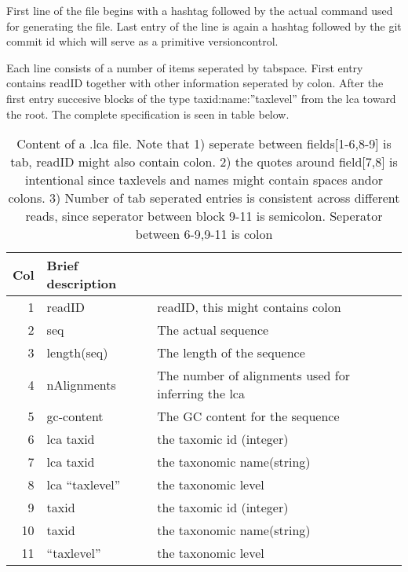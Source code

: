 \documentclass[10pt]{article}
\begin{document}
First line of the file begins with a hashtag followed by the actual command used for generating the file. Last entry of the line is again a hashtag followed by the git commit id which will serve as a primitive versioncontrol.

Each line consists of a number of items seperated by tabspace. First entry contains readID together with other information seperated by colon. After the first entry succesive blocks of the type taxid:name:''taxlevel'' from the lca toward the root. The complete specification is seen in table below.

\begin{table}[h]
\begin{tabular}{rll}
  \hline
  {\bf Col} & {\bf Brief description} \\
  \hline
  1 & {\sf readID} & readID, this might contains colon\\
  2 & {\sf seq} & The actual sequence\\
  3 & {\sf length(seq)} & The length of the sequence\\
  4 & {\sf nAlignments} & The number of alignments used for inferring the lca\\
  5 & {\sf gc-content} & The GC content for the sequence\\\hline\hline
  6 & {\sf lca taxid} & the taxomic id (integer)\\
  7 & {\sf lca taxid} & the taxonomic name(string)\\
  8 & {\sf lca ``taxlevel''} & the taxonomic level\\\hline\hline
  9 & {\sf taxid} & the taxomic id (integer)\\
  10 & {\sf taxid} & the taxonomic name(string)\\
  11 & {\sf ``taxlevel''} & the taxonomic level\\\hline\hline
\end{tabular}\label{tab2}
\caption{Content of a .lca file. Note that 1) seperate between
  fields[1-6,8-9] is tab, readID might also contain colon. 2) the
  quotes around field[7,8] is intentional since taxlevels and names
  might contain spaces andor colons. 3) Number of tab seperated
  entries is consistent across different reads, since seperator
  between block 9-11 is semicolon. Seperator between 6-9,9-11 is colon}
\end{table}
\end{document}
